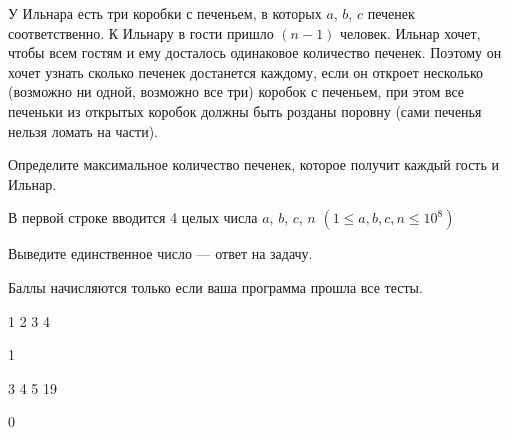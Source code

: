 
У Ильнара есть три коробки с печеньем, в которых $a$, $b$, $c$ печенек соответственно. К Ильнару 
в гости пришло $(n - 1)$ человек. Ильнар хочет, чтобы всем гостям и ему досталось одинаковое 
количество печенек. Поэтому он хочет узнать сколько печенек достанется каждому, 
если он откроет несколько (возможно ни одной, возможно все три) коробок с печеньем, 
при этом все печеньки из открытых коробок должны быть розданы поровну 
(сами печенья нельзя ломать на части).  

Определите максимальное количество печенек, которое получит каждый гость и Ильнар.


В первой строке вводится 4 целых числа $a$, $b$, $c$, $n$ $(1 \leq a, b, c, n \leq 10^8)$ 

\outputfmtSection

Выведите единственное число — ответ на задачу.

\markSection

Баллы начисляются только если ваша программа прошла все тесты.


\begin{myverbbox}[\small]{\vinput}
    1 2 3 4
\end{myverbbox}
\begin{myverbbox}[\small]{\voutput}
    1
\end{myverbbox}


\begin{myverbbox}[\small]{\vinput}
    3 4 5 19
\end{myverbbox}
\begin{myverbbox}[\small]{\voutput}
    0
\end{myverbbox}

